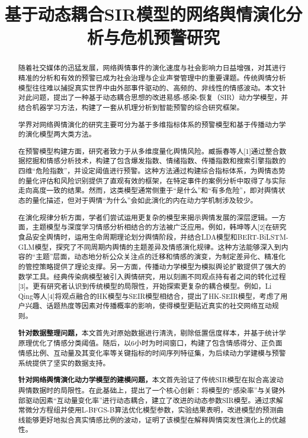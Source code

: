 \documentclass[withoutpreface,bwprint]{cumcmthesis}
\title{基于动态耦合SIR模型的网络舆情演化分析与危机预警研究}  %
\begin{document}
\maketitle
\begin{abstract}
随着社交媒体的迅猛发展，网络舆情事件的演化速度与社会影响力日益增强，对其进行精准的分析和有效的预警已成为社会治理与企业声誉管理中的重要课题。传统舆情分析模型往往难以捕捉真实世界中由外部事件驱动的、高频的、非线性的情感波动。本文针对此问题，提出了一种基于动态耦合思想的改进易感-感染-恢复（SIR）动力学模型，并结合机器学习方法，构建了一套从机理分析到智能预警的综合研究框架。

学界对网络舆情演化的研究主要可分为基于多维指标体系的预警模型和基于传播动力学的演化模型两大类方法。

在预警模型构建方面，研究者致力于从多维度量化舆情风险。臧振春等人[1]通过整合数据挖掘和情感分析技术，构建了包含爆发指数、情绪指数、传播指数和搜索引擎指数的四维“危险指数”，并设定阈值进行预警。这种方法通过构建综合指标体系，为舆情态势的量化评估和风险识别提供了直观有效的框架，在特定事件的案例分析中取得了与实际走向高度一致的结果。然而，这类模型通常侧重于“是什么”和“有多危险”，即对舆情状态的量化描述，但对于舆情“为什么”会如此演化的内在动力学机制涉及较少。

在演化规律分析方面，学者们尝试运用更复杂的模型来揭示舆情发展的深层逻辑。一方面，主题模型与深度学习情感分析相结合的方法被广泛应用。例如，韩坤等人[2]在研究食品安全舆情时，运用生命周期理论划分舆情阶段，并结合LDA模型和BERT-BiLSTM-GLM模型，探究了不同周期内舆情的主题差异及情感演化规律。这种方法能够深入到内容的“主题”层面，动态地分析公众关注点的迁移和情感的演变，为制定差异化、精准化的管控策略提供了理论支撑。另一方面，传播动力学模型为模拟舆论扩散提供了强大的数学工具。经典传染病模型被引入舆情研究，用以刻画不同观点持有者之间的转化过程[3]。更有研究者认识到传统模型的局限性，开始探索更复杂的耦合模型。例如，Li Qing等人[4]将观点融合的HK模型与SEIR模型相结合，提出了HK-SEIR模型，考虑了用户兴趣、话题热度等因素对传播概率的影响，使得模型更贴近真实的社交网络互动规则。

\textbf{针对数据整理问题，}本文首先对原始数据进行清洗，剔除低置信度样本，并基于统计学原理优化了情感分类阈值。随后，以6小时为时间窗口，构建了包含情感得分、正负面情感比例、互动量及其变化率等关键指标的时间序列特征集，为后续动力学建模与预警系统提供了坚实的数据支持。

\textbf{针对网络舆情演化动力学模型的建模问题，}本文首先验证了传统SIR模型在拟合高波动舆情数据时的局限性。在此基础上，提出了一个核心创新：将模型的“感染率”与关键外部驱动因素“互动量变化率”进行动态耦合，建立了改进的动态参数SIR模型。通过求解常微分方程组并使用L-BFGS-B算法优化模型参数，实验结果表明，改进模型的预测曲线能够更好地拟合真实情感比例的波动，证明了该模型在解释舆情突发性演化上的优越性。


\end{abstract}
\end{document}
